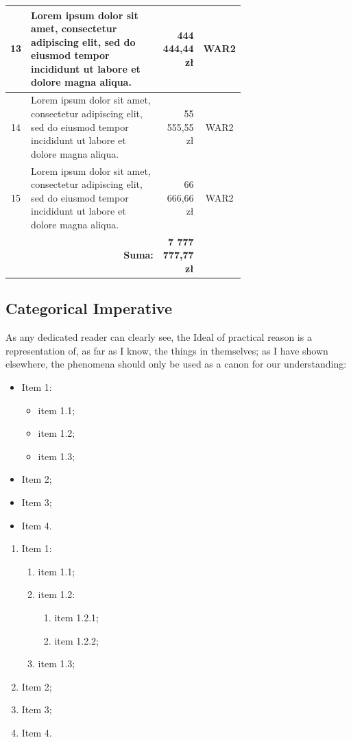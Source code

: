 \documentclass[
    left=2.5cm,         %
    right=2.5cm,        %
    top=2.5cm,          %
    bottom=3cm,         %
    bindingoffset=6mm,  %
    nohyphenation=true %
]{eiti/eiti-thesis} %
\begin{document}
\begin{longtable}{| c | m{0.58\linewidth} | r | m{0.1\linewidth} |}
	13 & Lorem ipsum dolor sit amet, consectetur adipiscing elit, sed do eiusmod tempor incididunt ut labore et dolore magna aliqua. & 444 444,44 zł & \multicolumn{1}{c|}{WAR2} \\ \hline
	14 & Lorem ipsum dolor sit amet, consectetur adipiscing elit, sed do eiusmod tempor incididunt ut labore et dolore magna aliqua. & 55 555,55 zł & \multicolumn{1}{c|}{WAR2} \\ \hline
	15 & Lorem ipsum dolor sit amet, consectetur adipiscing elit, sed do eiusmod tempor incididunt ut labore et dolore magna aliqua. & 66 666,66 zł & \multicolumn{1}{c|}{WAR2} \\ \hline
	& \multicolumn{1}{r|}{\textbf{Suma:}} & \textbf{7 777 777,77 zł} & 
	\label{table:koszty}
\end{longtable}
\kant[4]

\subsection{Categorical Imperative}
As any dedicated reader can clearly see, the Ideal of practical reason is a representation of, as far as I know, the things in themselves; as I have shown elsewhere, the phenomena should only be used as a canon for our understanding:
\begin{itemize}
	\item Item 1:
	\begin{itemize}[label=---]
		\item item 1.1;
		\item item 1.2;
		\item item 1.3;
	\end{itemize}
	\item Item 2;
	\item Item 3;
	\item Item 4.
\end{itemize}

\kant[2]
\begin{enumerate}
	\item Item 1:
	\begin{enumerate}
		\item item 1.1;
		\item item 1.2:
		\begin{enumerate}
			\item item 1.2.1;
			\item item 1.2.2;
		\end{enumerate}
		\item item 1.3;
	\end{enumerate}
	\item Item 2;
	\item Item 3;
	\item Item 4.
\end{enumerate}
\end{document}
